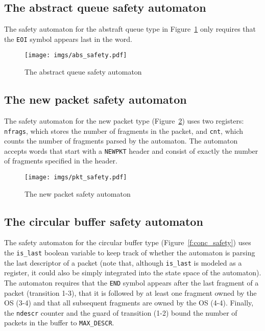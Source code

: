 \documentclass{article}
\begin{document}
\subsection{The abstract queue safety automaton}

The safety automaton for the abstraft queue type in 
Figure~\ref{f:abs_safety} only requires that the \texttt{EOI} 
symbol appears last in the word.

\begin{figure}[t]
    \center
    \texttt{[image: imgs/abs\_safety.pdf]}
    \caption{The abstract queue safety automaton}\label{f:abs_safety}
\end{figure}


\subsection{The new packet safety automaton}

The safety automaton for the new packet type 
(Figure~\ref{f:pkt_safety}) uses two registers: \texttt{nfrags}, 
which stores the number of fragments in the packet, and 
\texttt{cnt}, which counts the number of fragments parsed by the 
automaton.  The automaton accepts words that start with a 
\texttt{NEWPKT} header and consist of exactly the number of 
fragments specified in the header. 

\begin{figure}[t]
    \center
    \texttt{[image: imgs/pkt\_safety.pdf]}
    \caption{The new packet safety automaton}\label{f:pkt_safety}
\end{figure}




\subsection{The circular buffer safety 
automaton}\label{s:conc_safety}

The safety automaton for the circular buffer type 
(Figure~\ref{f:conc_safety}) uses the \texttt{is\_last} boolean 
variable to keep track of whether the automaton is parsing the 
last descriptor of a packet (note that, although \texttt{is\_last} 
is modeled as a register, it could also be simply integrated into 
the state space of the automaton).  The automaton requires that 
the \texttt{END} symbol appears after the last fragment of a 
packet (transition 1-3), that it is followed by at least one 
fragment owned by the OS (3-4) and that all subsequent fragments 
are owned by the OS (4-4).  Finally, the \texttt{ndescr} counter 
and the guard of transition (1-2) bound the number of packets in 
the buffer to \texttt{MAX\_DESCR}.
\end{document}
